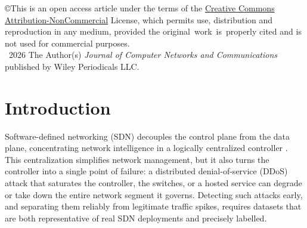 \documentclass[ASNA,twocolumn]{USG}
\begin{document}





\copyright{This is an open access article under the terms of the \href{Creative Commons Attribution-NonCommercial}{Creative Commons Attribution-NonCommercial} License, which permits use, distribution and reproduction in any medium, provided the
original~work~is~properly cited and is not used for commercial purposes.
\\[5pt]
  \textcopyright~2026 The Author(s) \textit{Journal of Computer Networks and Communications} published by Wiley Periodicals LLC.}


\maketitle
\makeatletter\foot@measure\enlargethispage{-\foot@raise}\makeatother


\section{Introduction}\label{sec:intro}

Software-defined networking (SDN) decouples the control plane from the data plane, concentrating network intelligence in a logically centralized controller \citep{kreutz2015sdn}. This centralization simplifies network management, but it also turns the controller into a single point of failure: a distributed denial-of-service (DDoS) attack that saturates the controller, the switches, or a hosted service can degrade or take down the entire network segment it governs. Detecting such attacks early, and separating them reliably from legitimate traffic spikes, requires datasets that are both representative of real SDN deployments and precisely labelled.
\end{document}
